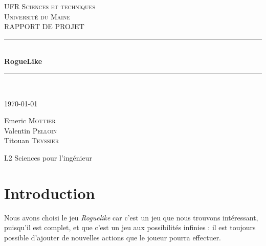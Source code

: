 \documentclass[11pt]{report}
\begin{document}
\begin{titlepage}
	
	\newcommand{\HRule}{\rule{\linewidth}{0.5mm}}
	\center
	
	\vspace*{30pt}
	
	\textsc{\Large UFR Sciences et techniques\\ Université du Maine}\\[1.5cm]
	
	\Large RAPPORT DE PROJET\\[1.5cm]
	

	\vspace*{\fill}
	
	\HRule \\[0.4cm]
	{ \huge \bfseries RogueLike}\\
	\HRule \\[1.5cm]
	 
	 
	 \vspace{12pt}
	 
	{\large \today}\\[1cm]
	
	\vspace{12pt}
	
	\Large 
	
		Emeric \textsc{Mottier}\\
		Valentin \textsc{Pelloin}\\
		Titouan \textsc{Teyssier}\\
	
		\vspace{12pt}
		
		L2 Sciences pour l'ingénieur
		
	\vspace*{\fill}
	
\end{titlepage}

\tableofcontents

\chapter{Introduction}

	Nous avons choisi le jeu \emph{Roguelike} car c'est un jeu que nous trouvons intéressant, puisqu'il est complet, et que c'est un jeu aux possibilités infinies :  il est toujours possible d'ajouter de nouvelles actions que le joueur pourra effectuer.
	
	\vspace{12pt}
	
\end{document}
